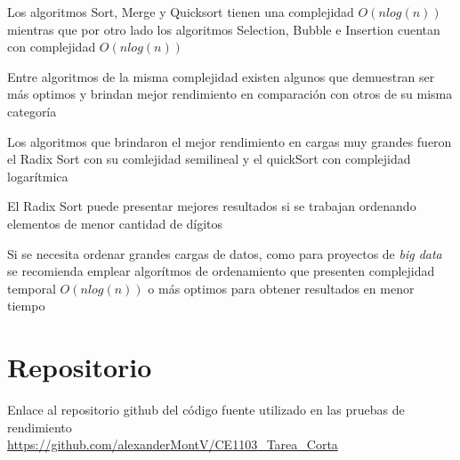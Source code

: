 \documentclass{report}
\begin{document}
	Los algoritmos Sort, Merge y Quicksort tienen una complejidad $O(nlog(n))$ mientras que por otro lado los algoritmos Selection, Bubble e Insertion cuentan con complejidad $O(nlog(n))$
	
	Entre algoritmos de la misma complejidad existen algunos que demuestran ser más optimos y brindan mejor rendimiento en comparación con otros de su misma categoría
	
	Los algoritmos que brindaron el mejor rendimiento en cargas muy grandes fueron el Radix Sort con su comlejidad semilineal y el quickSort con complejidad logarítmica
	
	El Radix Sort puede presentar mejores resultados si se trabajan ordenando elementos de menor cantidad de dígitos
	
	Si se necesita ordenar grandes cargas de datos, como para proyectos de \textit{big data} se recomienda emplear algorítmos de ordenamiento que presenten complejidad temporal $O(nlog(n))$ o más optimos para obtener resultados en menor tiempo
	\section*{Repositorio}
	Enlace al repositorio github del código fuente utilizado en las pruebas de rendimiento\\ \url{https://github.com/alexanderMontV/CE1103_Tarea_Corta}
	
	\newpage 
	
	
	
	
	
	
\end{document}
